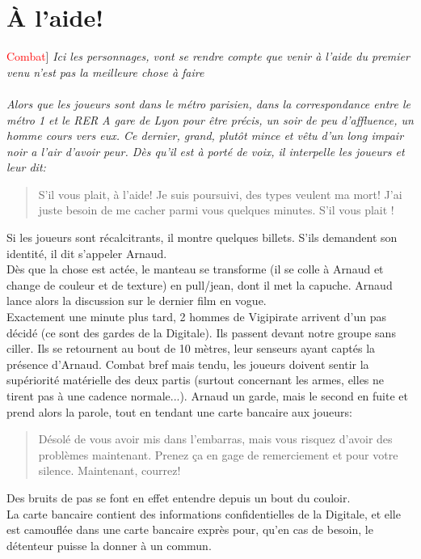 \documentclass[10pt,a4paper,twocolumn]{article}
\newenvironment{lAbstract}[1]{{[}\textcolor{red}{#1}{]}\itshape}{\\ \\}
\begin{document}
\section{À l'aide!}
\begin{lAbstract}{Combat}
Ici les personnages, vont se rendre compte que venir à l'aide du premier venu n'est pas la meilleure chose à faire
\end{lAbstract}
Alors que les joueurs sont dans le métro parisien, dans la correspondance entre le métro 1 et le RER A gare de Lyon pour être précis, un soir de peu d'affluence, un homme cours vers eux. Ce  dernier, grand, plutôt mince et vêtu d'un long impair noir a l'air d'avoir peur. Dès qu'il est à porté de voix, il interpelle les joueurs et leur dit:
\begin{quote}
S'il vous plait, à l'aide! Je suis poursuivi, des types veulent ma mort! J'ai juste besoin de me cacher parmi vous quelques minutes. S'il vous plait !
\end{quote}
Si les joueurs sont récalcitrants, il montre quelques billets. S'ils demandent son identité, il dit s'appeler Arnaud.
\\
Dès que la chose est actée, le manteau se transforme (il se colle à Arnaud et change de couleur et de texture) en pull/jean, dont il met la capuche. Arnaud lance alors la discussion sur le dernier film en vogue.\\
Exactement une minute plus tard, 2 hommes de Vigipirate arrivent d'un pas décidé (ce sont des gardes de la Digitale). Ils passent devant notre groupe sans ciller. Ils se retournent au bout de 10 mètres, leur senseurs ayant captés la présence d'Arnaud. Combat bref mais tendu, les joueurs doivent sentir la supériorité matérielle des deux partis (surtout concernant les armes, elles ne tirent pas à une cadence normale...). Arnaud un garde, mais le second en fuite et prend alors la parole, tout en tendant une carte bancaire aux joueurs:
\begin{quote}
Désolé de vous avoir mis dans l'embarras, mais vous risquez d'avoir des problèmes maintenant. Prenez ça en gage de remerciement et pour votre silence. Maintenant, courrez!
\end{quote}
Des bruits de pas se font en effet entendre depuis un bout du couloir. \\
La carte bancaire contient des informations confidentielles de la Digitale, et elle est camouflée dans une carte bancaire exprès pour, qu'en cas de besoin, le détenteur puisse la donner à un commun.
\end{document}
